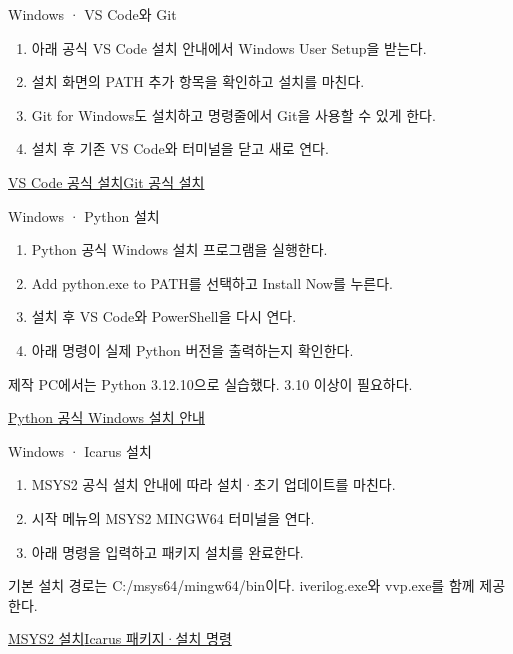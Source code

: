\begin{frame}[label=vscode-install-tools]{Windows · VS Code와 Git}\relax
\small
\begin{enumerate}\setlength{\itemsep}{0.22cm}
\item 아래 공식 VS Code 설치 안내에서 Windows User Setup을 받는다.
\item 설치 화면의 PATH 추가 항목을 확인하고 설치를 마친다.
\item Git for Windows도 설치하고 명령줄에서 Git을 사용할 수 있게 한다.
\item 설치 후 기존 VS Code와 터미널을 닫고 새로 연다.
\end{enumerate}
\href{https://code.visualstudio.com/docs/setup/windows}{VS Code 공식 설치}\quad\href{https://git-scm.com/install/windows}{Git 공식 설치}
\end{frame}

\begin{frame}{Windows · Python 설치}\relax
\small
\begin{enumerate}\setlength{\itemsep}{0.22cm}
\item Python 공식 Windows 설치 프로그램을 실행한다.
\item Add python.exe to PATH를 선택하고 Install Now를 누른다.
\item 설치 후 VS Code와 PowerShell을 다시 연다.
\item 아래 명령이 실제 Python 버전을 출력하는지 확인한다.
\end{enumerate}
제작 PC에서는 Python 3.12.10으로 실습했다. 3.10 이상이 필요하다.\par\href{https://docs.python.org/3.12/using/windows.html}{Python 공식 Windows 설치 안내}
\end{frame}

\begin{frame}{Windows · Icarus 설치}\relax
\small
\begin{enumerate}\setlength{\itemsep}{0.22cm}
\item MSYS2 공식 설치 안내에 따라 설치·초기 업데이트를 마친다.
\item 시작 메뉴의 MSYS2 MINGW64 터미널을 연다.
\item 아래 명령을 입력하고 패키지 설치를 완료한다.
\end{enumerate}
기본 설치 경로는 C:/msys64/mingw64/bin이다. iverilog.exe와 vvp.exe를 함께 제공한다.\par\href{https://www.msys2.org/}{MSYS2 설치}\quad\href{https://packages.msys2.org/packages/mingw-w64-x86_64-iverilog}{Icarus 패키지·설치 명령}
\end{frame}

